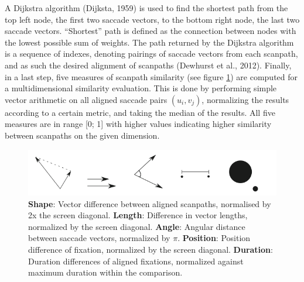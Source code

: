 \documentclass[a4paper, 12pt]{scrreprt}
\begin{document}
A Dijkstra algorithm (Dijksta, 1959) is used to find the shortest path from the top left node, the first two saccade vectors, to the bottom right node, the last two saccade vectors. “Shortest” path is defined as the connection between nodes with the lowest possible sum of weights. The path returned by the Dijkstra algorithm is a sequence of indexes, denoting pairings of saccade vectors from each scanpath, and as such the desired alignment of scanpaths (Dewhurst et al., 2012).  Finally, in a last step, five measures of scanpath similarity (see figure \ref{fig:simmeasures}) are computed for a multidimensional similarity evaluation. This is done by performing simple vector arithmetic on all aligned saccade pairs $(u_i, v_j)$, normalizing the results according to a certain metric, and taking the median of the results. All five measures are in range [0; 1] with higher values indicating higher similarity between scanpaths on the given dimension. \newline

\begin{figure}
	\includegraphics[scale=0.5]{img/simmeasures.png}
	\caption[Similarity measures]{\small{\textbf{Shape}: Vector difference between aligned scanpaths, normalised by 2x the screen diagonal. \textbf{Length}: Difference in vector lengths, normalized by the screen diagonal. \textbf{Angle}: Angular distance between saccade vectors, normalized by $\pi$. \textbf{Position}: Position difference of fixation, normalized by the screen diagonal. \textbf{Duration}: Duration differences of aligned fixations, normalized against maximum duration within the comparison.}}
	\label{fig:simmeasures}
\end{figure}
\end{document}
